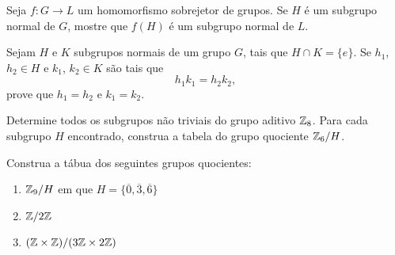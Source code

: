 \documentclass[12pt]{exam}
\begin{document}
    \questao{} Seja $f : G \to L$ um homomorfismo sobrejetor de grupos. Se $H$ \'e um subgrupo normal de $G$, mostre que $f(H)$ \'e um subgrupo normal de $L$.
  
    \vspace{.3cm}

    \questao{} Sejam $H$ e $K$ subgrupos normais de um grupo $G$, tais que $H \cap K = \{e\}$. Se $h_1$, $h_2 \in H$ e $k_1$, $k_2 \in K$ s\~ao tais que
    \[
      h_1k_1 = h_2k_2,
    \]
    prove que $h_1 = h_2$ e $k_1 = k_2$.

    \vspace{.3cm}

    \questao{} Determine todos os subgrupos n\~ao triviais do grupo aditivo $\mathbb{Z}_8$. Para cada subgrupo $H$ encontrado, construa a tabela do grupo quociente $\mathbb{Z}_6/H$.

    \vspace{.3cm}

    \questao{} Construa a t\'abua dos seguintes grupos quocientes:
    \begin{enumerate}[label=({\alph*})]
      \item $\mathbb{Z}_9/H$ em que $H = \{\overline{0}, \overline{3}, \overline{6}\}$

      \item $\mathbb{Z}/2\mathbb{Z}$

      \item $(\mathbb{Z} \times \mathbb{Z})/(3\mathbb{Z} \times 2\mathbb{Z})$
    \end{enumerate}
\end{document}
